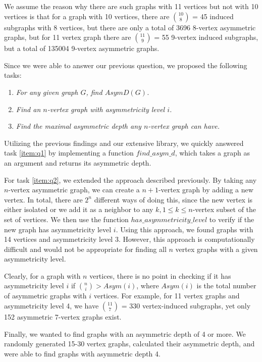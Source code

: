 We assume the reason why there are such graphs with 11 vertices but not with 10 vertices is that for a graph with 10 vertices, there are $\binom{10}{8}$ = 45 induced subgraphs with 8 vertices, but there are only a total of 3696 8-vertex asymmetric graphs, but for 11 vertex graph there are $\binom{11}{9}$ = 55 9-vertex induced subgraphs, but a total of 135004 9-vertex asymmetric graphs.

Since we were able to answer our previous question, we proposed the following tasks:

\begin{enumerate}
\item \emph{For any given graph $G$, find $AsymD(G)$.} \label{item:q1}
\item \emph{Find an $n$-vertex graph with asymmetricity level $i$.} \label{item:q2}
\item \emph{Find the maximal asymmetric depth any $n$-vertex graph can have.} \label{item:q3}
\end{enumerate}

Utilizing the previous findings and our extensive library, we quickly answered task \ref{item:q1} by implementing a function $find\_asym\_d$, which takes a graph as an argument and returns its asymmetric depth.

For task \ref{item:q2}, we extended the approach described previously. By taking any $n$-vertex asymmetric graph, we can create a $n+1$-vertex graph by adding a new vertex. In total, there are $2^n$ different ways of doing this, since the new vertex is either isolated or we add it as a neighbor to any $k, 1 \leq k \leq n$-vertex subset of the set of vertices. We then use the function $has\_asymmetricity\_level$ to verify if the new graph has asymmetricity level $i$. Using this approach, we found graphs with 14 vertices and asymmetricity level 3. However, this approach is computationally difficult and would not be appropriate for finding all $n$ vertex graphs with a given asymmetricity level.

Clearly, for a graph with $n$ vertices, there is no point in checking if it has asymmetricity level $i$ if $\binom{n}{i} > Asym(i)$, where $Asym(i)$ is the total number of asymmetric graphs with $i$ vertices. For example, for 11 vertex graphs and asymmetricity level 4, we have $\binom{11}{7}$ = 330 vertex-induced subgraphs, yet only 152 asymmetric 7-vertex graphs exist.

Finally, we wanted to find graphs with an asymmetric depth of 4 or more. We randomly generated 15-30 vertex graphs, calculated their asymmetric depth, and were able to find graphs with asymmetric depth 4.

